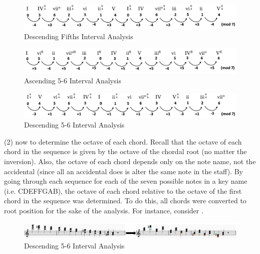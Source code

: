 \documentclass{report}
\begin{document}
\begin{figure}[h!]
\centering
\includegraphics[width=\textwidth]{images/desc_fifths_intervals}
  \caption{Descending Fifths Interval Analysis}
\end{figure}

\begin{figure}[h!]
\centering
\includegraphics[width=\textwidth]{images/asc_56_intervals}
  \caption{Ascending 5-6 Interval Analysis}
\end{figure}

\begin{figure}[h!]
\centering
\includegraphics[width=\textwidth]{images/desc_56_intervals}
  \caption{Descending 5-6 Interval Analysis}
\end{figure}

(2) now to determine the octave of each chord. Recall that the octave of each chord in the sequence is given by the octave of the chordal root (no matter the inversion). Also, the octave of each chord depends only on the note name, not the accidental (since all an accidental does is alter the same note in the staff). By going through each sequence for each of the seven possible notes in a key name (i.e. CDEFFGAB), the octave of each chord relative to the octave of the first chord in the sequence was determined. To do this, all chords were converted to root position for the sake of the analysis. For instance, consider . 

\begin{figure}[h!]
\centering
\includegraphics[width=1.1\textwidth]{images/desc56-example}
  \caption{Descending 5-6 Interval Analysis}
  \label{fig:desc56-example}
\end{figure}
\end{document}
